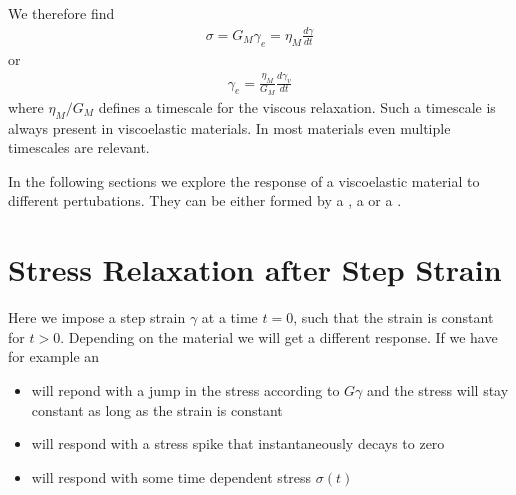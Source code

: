 \documentclass[letterpaper,10pt,english]{sphinxmanual}
\begin{document}
\sphinxAtStartPar
We therefore find
\begin{equation*}
\begin{split}\sigma=G_M\gamma_e= \eta_M\frac{d\gamma}{dt}\end{split}
\end{equation*}
\sphinxAtStartPar
or
\begin{equation*}
\begin{split}\gamma_e=\frac{\eta_M}{G_M}\frac{d\gamma_v}{dt}\end{split}
\end{equation*}
\sphinxAtStartPar
where \(\eta_M/G_M\) defines a timescale for the viscous relaxation. Such a timescale is always present in viscoelastic materials. In most materials even multiple timescales are relevant.

\sphinxAtStartPar
In the following sections we explore the response of a viscoelastic material to different pertubations. They can be either formed by a , a  or a .


\section{Stress Relaxation after Step Strain}
\label{\detokenize{notebooks/L24/1_Viscoelasticity:Stress-Relaxation-after-Step-Strain}}
\sphinxAtStartPar
Here we impose a step strain \(\gamma\) at a time \(t=0\), such that the strain is constant for \(t>0\). Depending on the material we will get a different response. If we have for example an
\begin{itemize}
\item {} 
\sphinxAtStartPar
{} will repond with a jump in the stress according to \(G\gamma\) and the stress will stay constant as long as the strain is constant

\item {} 
\sphinxAtStartPar
{} will respond with a stress spike that instantaneously decays to zero

\item {} 
\sphinxAtStartPar
{} will respond with some time dependent stress \(\sigma(t)\)

\end{itemize}
\end{document}
